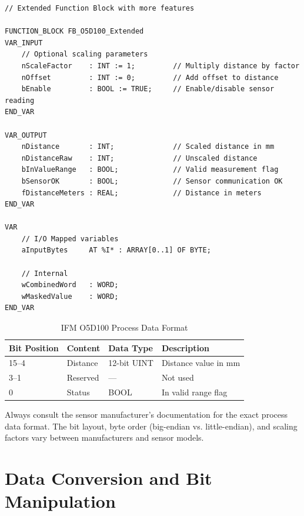 \documentclass[11pt,a4paper]{article}
\begin{document}
\begin{lstlisting}
// Extended Function Block with more features

FUNCTION_BLOCK FB_O5D100_Extended
VAR_INPUT
    // Optional scaling parameters
    nScaleFactor    : INT := 1;         // Multiply distance by factor
    nOffset         : INT := 0;         // Add offset to distance
    bEnable         : BOOL := TRUE;     // Enable/disable sensor reading
END_VAR

VAR_OUTPUT
    nDistance       : INT;              // Scaled distance in mm
    nDistanceRaw    : INT;              // Unscaled distance
    bInValueRange   : BOOL;             // Valid measurement flag
    bSensorOK       : BOOL;             // Sensor communication OK
    fDistanceMeters : REAL;             // Distance in meters
END_VAR

VAR
    // I/O Mapped variables
    aInputBytes     AT %I* : ARRAY[0..1] OF BYTE;
    
    // Internal
    wCombinedWord   : WORD;
    wMaskedValue    : WORD;
END_VAR
\end{lstlisting}

\begin{table}[h]
\centering
\begin{tabular}{@{}llll@{}}
\toprule
\textbf{Bit Position} & \textbf{Content} & \textbf{Data Type} & \textbf{Description} \\
\midrule
15--4 & Distance & 12-bit UINT & Distance value in mm \\
3--1 & Reserved & --- & Not used \\
0 & Status & BOOL & In valid range flag \\
\bottomrule
\end{tabular}
\caption{IFM O5D100 Process Data Format}
\end{table}

\begin{notebox}
Always consult the sensor manufacturer's documentation for the exact process data format. The bit layout, byte order (big-endian vs. little-endian), and scaling factors vary between manufacturers and sensor models.
\end{notebox}

\section{Data Conversion and Bit Manipulation}
\end{document}
